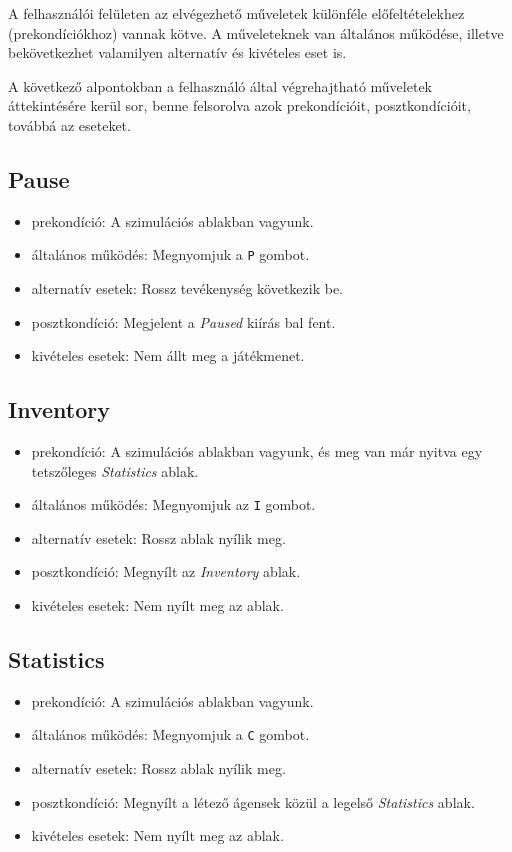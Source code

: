 
A felhasználói felületen az elvégezhető műveletek különféle előfeltételekhez (prekondíciókhoz) vannak kötve. A műveleteknek van általános működése, illetve bekövetkezhet valamilyen alternatív és kivételes eset is.

A következő alpontokban a felhasználó által végrehajtható műveletek áttekintésére kerül sor, benne felsorolva azok prekondícióit, posztkondícióit, továbbá az eseteket.

\subsection{Pause}

\begin{itemize}
    \item prekondíció: A szimulációs ablakban vagyunk.
    \item általános működés: Megnyomjuk a \texttt{P} gombot.
    \item alternatív esetek: Rossz tevékenység következik be.
    \item posztkondíció: Megjelent a \textit{Paused} kiírás bal fent.
    \item kivételes esetek: Nem állt meg a játékmenet.
\end{itemize}

\subsection{Inventory}

\begin{itemize}
    \item prekondíció: A szimulációs ablakban vagyunk, és meg van már nyitva egy tetszőleges \textit{Statistics} ablak.
    \item általános működés: Megnyomjuk az \texttt{I} gombot.
    \item alternatív esetek: Rossz ablak nyílik meg.
    \item posztkondíció: Megnyílt az \textit{Inventory} ablak.
    \item kivételes esetek: Nem nyílt meg az ablak.
\end{itemize}

\subsection{Statistics}

\begin{itemize}
    \item prekondíció: A szimulációs ablakban vagyunk.
    \item általános működés: Megnyomjuk a \texttt{C} gombot.
    \item alternatív esetek: Rossz ablak nyílik meg.
    \item posztkondíció: Megnyílt a létező ágensek közül a legelső \textit{Statistics} ablak.
    \item kivételes esetek: Nem nyílt meg az ablak.
\end{itemize}

